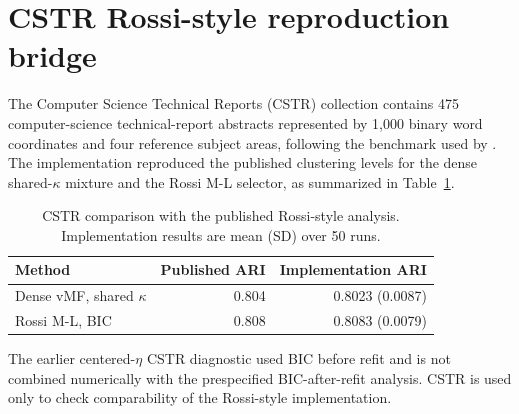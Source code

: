 \documentclass[preprint,12pt,authoryear]{elsarticle}
\begin{document}
\section{CSTR Rossi-style reproduction bridge}
\label{sec:s-cstr-bridge}

The Computer Science Technical Reports (CSTR) collection contains 475
computer-science technical-report abstracts represented by
1,000 binary word coordinates and four reference subject areas, following the
benchmark used by \citet{rossi2022sparsevmf}. The implementation reproduced
the published clustering levels for the dense shared-$\kappa$ mixture and the
Rossi M-L selector, as summarized in Table~\ref{tab:s-cstr-bridge}.

\begin{table}[H]
\centering
\small
\caption{CSTR comparison with the published Rossi-style analysis.
Implementation results are mean (SD) over 50 runs.}
\label{tab:s-cstr-bridge}
\begin{tabular}{lrr}
\toprule
Method & Published ARI & Implementation ARI \\
\midrule
Dense vMF, shared $\kappa$ & 0.804 & 0.8023 (0.0087) \\
Rossi M-L, BIC & 0.808 & 0.8083 (0.0079) \\
\bottomrule
\end{tabular}
\end{table}

The earlier centered-$\eta$ CSTR diagnostic used BIC before refit and is not
combined numerically with the prespecified BIC-after-refit analysis. CSTR is used only to
check comparability of the Rossi-style implementation.



\end{document}
